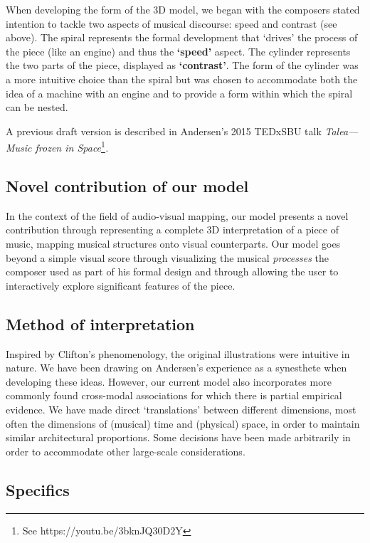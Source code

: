 \documentclass[sigconf]{nimeart}
\begin{document}
When developing the form of the 3D model, we began with the composer\textquotesingle s stated intention to tackle two aspects of musical discourse: speed and contrast (see above). The spiral represents the formal development that `drives' the process of the piece (like an engine) and thus the \textbf{`speed'} aspect. The cylinder represents the two parts of the piece, displayed as \textbf{`contrast'}. The form of the cylinder was a more intuitive choice than the spiral but was chosen to accommodate both the idea of a machine with an engine and to provide a form within which the spiral can be nested.

A previous draft version is described in Andersen's 2015 TEDxSBU talk \emph{Talea---Music frozen in Space}\footnote{See https://youtu.be/3bknJQ30D2Y}\emph{.}

\subsection{Novel contribution of our model}\label{novel-contribution-of-our-model}

In the context of the field of audio-visual mapping, our model presents a novel contribution through representing a complete 3D interpretation of a piece of music, mapping musical structures onto visual counterparts. Our model goes beyond a simple visual score through visualizing the musical \emph{processes} the composer used as part of his formal design and through allowing the user to interactively explore significant features of the piece.~

\subsection{Method of interpretation}\label{method-of-interpretation}

Inspired by Clifton's phenomenology, the original illustrations were intuitive in nature. We have been drawing on Andersen's experience as a synesthete when developing these ideas. However, our current model also incorporates more commonly found cross-modal associations for which there is partial empirical evidence. We have made direct `translations' between different dimensions, most often the dimensions of (musical) time and (physical) space, in order to maintain similar architectural proportions. Some decisions have been made arbitrarily in order to accommodate other large-scale considerations.~

\subsection{Specifics}\label{specifics}
\end{document}
